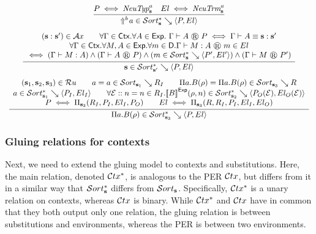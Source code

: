 \[
\begin{array}{c}
  \infer{
    \glusortrel {\dreflect b a} P {El}
  }{
    P \iff \gluneutp a
    &
    El \iff \gluneutm a
  }
  \\[8pt]
  \infer{
    \glusortrel[\tmcst s'] {\tmcst s} P {El}
  }{
    \begin{array}{c}
      (\tmcst s : \tmcst s') \in \Ax
      \qquad
      \forall \Gamma \in \Ctx. \forall A \in \Exp.\ \glutpjudg \Gamma A P \iff \eqexp \Gamma A {\tmcst s} {\tmcst s'}
      \\
      \forall \Gamma \in \Ctx. \forall M,A \in \Exp. \forall m \in \Dom. \glutmjudg \Gamma M A m {El}
      \\
      \iff (\wfexp \Gamma M A) \land (\glutpjudg \Gamma A P) \land (\glusortrel m {P'} {El'}) \land (\glutpjudg \Gamma M {P'})
    \end{array}
  }
  \\[8pt]
  \infer{
    \glusortrel[\tmcst s_3] {\dpi a B \rho} P {El}
  }{
    \begin{array}{c}
      (\tmcst s_1, \tmcst s_2, \tmcst s_3) \in \Ru
      \qquad
      \persortrel[\tmcst s_1] a a {R_I}
      \qquad
      \persortrel[\tmcst s_3] {\dpi a B \rho} {\dpi a B \rho} R
      \\
      \glusortrel[\tmcst s_1] a {P_I} {El_I}
      \qquad
      \forall \EE :: \perrel n n {R_I}. \glusortrel[\tmcst s_2] {\evalexpfunc B {\rho, n}} {P_O(\EE)} {El_O(\EE)}
      \\
      P \iff \glupitp[\tmcst s_3] {R_I} {P_I} {El_I} {P_O}
      \qquad
      El \iff \glupitm[\tmcst s_3] R {R_I} {P_I} {El_I} {El_O}
    \end{array}
  }
\end{array}
\]


\subsubsection{Gluing relations for contexts}

Next, we need to extend the gluing model to contexts and substitutions.
Here, the main relation, denoted $\mathcal{C}tx^*$, is analogous to the \ac{PER} $\mathcal{C}tx$, but differs from it in a similar way that $\glusort$ differs from $\persort$.
Specifically, $\mathcal{C}tx^*$ is a unary relation on contexts, whereas $\mathcal{C}tx$ is binary.
While $\mathcal{C}tx^*$ and $\mathcal{C}tx$ have in common that they both output only one relation,
  the gluing relation is between substitutions and environments, whereas the \ac{PER} is between two environments.

